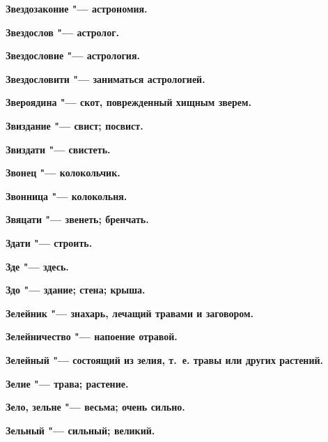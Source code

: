 \begin{mymulticols}{2}
\bfseries Звездозаконие\normalfont{} "--- астрономия. 




\bfseries Звездослов\normalfont{} "--- астролог. 




\bfseries Звездословие\normalfont{} "--- астрология. 




\bfseries Звездословити\normalfont{} "--- заниматься астрологией. 




\bfseries Звероядина\normalfont{} "--- скот, поврежденный хищным зверем. 




\bfseries Звиздание\normalfont{} "--- свист; посвист. 




\bfseries Звиздати\normalfont{} "--- свистеть. 




\bfseries Звонец\normalfont{} "--- колокольчик. 




\bfseries Звонница\normalfont{} "--- колокольня. 




\bfseries Звяцати\normalfont{} "--- звенеть; бренчать. 




\bfseries Здати\normalfont{} "--- строить. 




\bfseries Зде\normalfont{} "--- здесь. 




\bfseries Здо\normalfont{} "--- здание; стена; крыша. 




\bfseries Зелейник\normalfont{} "--- знахарь, лечащий травами и заговором. 




\bfseries Зелейничество\normalfont{} "--- напоение отравой. 




\bfseries Зелейный\normalfont{} "--- состоящий из зелия, т.~е. травы или других растений. 




\bfseries Зелие\normalfont{} "--- трава; растение. 




\bfseries Зело, зельне\normalfont{} "--- весьма; очень сильно. 




\bfseries Зельный\normalfont{} "--- сильный; великий. 





\end{mymulticols}
